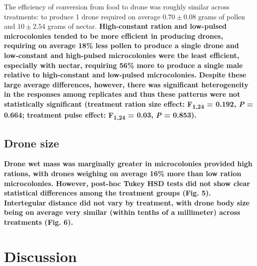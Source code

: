 \documentclass[11pt,]{article}
\begin{document}
The efficiency of conversion from food to drone was roughly similar
across treatments: to produce 1 drone required on average
\(0.70 \pm 0.08\) grams of pollen and \(10 \pm 2.54\) grams of nectar.
\textbf{High-constant ration and low-pulsed microcolonies tended to be
more efficient in producing drones, requiring on average 18\% less
pollen to produce a single drone and low-constant and high-pulsed
microcolonies were the least efficient, especially with nectar,
requiring 56\% more to produce a single male relative to high-constant
and low-pulsed microcolonies. Despite these large average differences,
however, there was significant heterogeneity in the responses among
replicates and thus these patterns were not statistically significant
(treatment ration size effect: F\textsubscript{1,24} = 0.192, \emph{P} =
0.664; treatment pulse effect: F\textsubscript{1,24} = 0.03, \emph{P} =
0.853).}

\hypertarget{drone-size}{%
\subsection{Drone size}\label{drone-size}}

\textbf{Drone wet mass was marginally greater in microcolonies provided
high rations, with drones weighing on average 16\% more than low ration
microcolonies. However, post-hoc Tukey HSD tests did not show clear
statistical differences among the treatment groups (Fig. 5).
Intertegular distance did not vary by treatment, with drone body size
being on average very similar (within tenths of a millimeter) across
treatments (Fig. 6).}

\hypertarget{discussion}{%
\section{Discussion}\label{discussion}}
\end{document}
